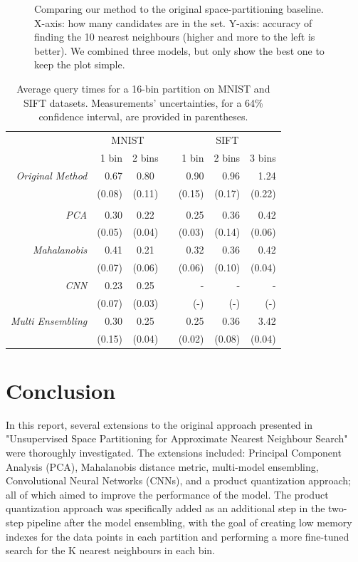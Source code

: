 \documentclass[sigconf, nonacm]{acmart}
\newcommand{\ra}[1]{\renewcommand{\arraystretch}{#1}}
\begin{document}
\begin{figure}[h]
    \caption{Comparing our method to the original space-partitioning baseline. X-axis: how many candidates are in the set. Y-axis: accuracy of finding the 10 nearest neighbours (higher and more to the left is better). We combined three models, but only show the best one to keep the plot simple.}
    \label{fig:graphs}
\end{figure}

\begin{table}
\centering
\ra{1.3}
\captionsetup{width=0.65\textwidth}
\caption{Average query times for a 16-bin partition on MNIST and SIFT datasets. Measurements' uncertainties, for a 64\% confidence interval, are provided in parentheses.}
\label{tab:query-time}
\begin{tabular}{@{}rrcrrrr@{}}\toprule
& \multicolumn{2}{c}{MNIST} & \phantom{abc}& \multicolumn{3}{c}{SIFT}\\
\cmidrule{2-3} \cmidrule{5-7}
& 1 bin & 2 bins && 1 bin & 2 bins & 3 bins \\\midrule
\textit{Original Method} & 0.67 & 0.80 && 0.90 & 0.96 & 1.24\\
    & (0.08) & (0.11) && (0.15) & (0.17) & (0.22)\\
\phantom{a}\\
\textit{PCA} & 0.30 & 0.22 && 0.25 & 0.36 & 0.42\\
    & (0.05) & (0.04) && (0.03) & (0.14) & (0.06)\\
\textit{Mahalanobis} & 0.41 & 0.21 && 0.32 & 0.36 & 0.42\\
    & (0.07) & (0.06) && (0.06) & (0.10) & (0.04)\\
\textit{CNN} & 0.23 & 0.25 && - & - & -\\
    & (0.07) & (0.03) && (-) & (-) & (-)\\
\textit{Multi Ensembling} & 0.30 & 0.25 && 0.25 & 0.36 & 3.42\\
    & (0.15) & (0.04) && (0.02) & (0.08) & (0.04)\\
\bottomrule
\end{tabular}
\end{table}


\section{Conclusion}
In this report, several extensions to the original approach presented in "Unsupervised Space Partitioning for Approximate Nearest Neighbour Search" were thoroughly investigated. The extensions included: Principal Component Analysis (PCA), Mahalanobis distance metric, multi-model ensembling, Convolutional Neural Networks (CNNs), and a product quantization approach; all of which aimed to improve the performance of the model. The product quantization approach was specifically added as an additional step in the two-step pipeline after the model ensembling, with the goal of creating low memory indexes for the data points in each partition and performing a more fine-tuned search for the K nearest neighbours in each bin.
\end{document}
